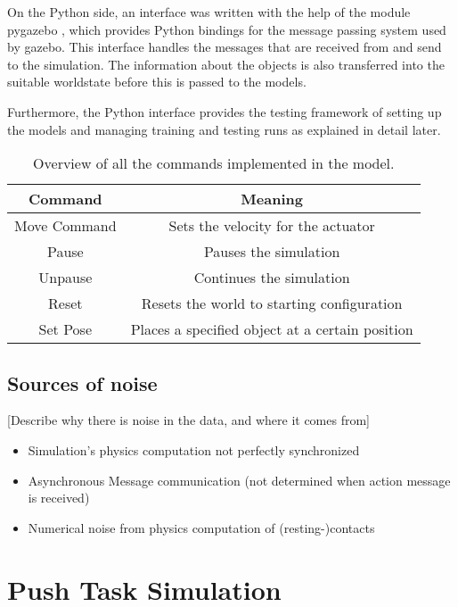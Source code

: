 On the Python side, an interface was written with the help of the module pygazebo \cite{pygazebo}, which provides Python bindings for the message passing system used by gazebo. This interface handles the messages that are received from and send to the simulation. 
The information about the objects is also transferred into the suitable worldstate before this is passed to the models.

Furthermore, the Python interface provides the testing framework of setting up the models and managing training and testing runs as explained in detail later.

\begin{table}
	\centering
	\begin{tabular}{|c|c|}
		\hline \textbf{Command} & \textbf{Meaning} \\ 
		\hline Move Command & Sets the velocity for the actuator \\ 
		\hline Pause & Pauses the simulation \\
		\hline Unpause & Continues the simulation \\
		\hline Reset & Resets the world to starting configuration \\
		\hline Set Pose & Places a specified object at a certain position \\
		\hline
	\end{tabular} 
	\caption{Overview of all the commands implemented in the model.}
	\label{tab:commands}
\end{table}

\subsection{Sources of noise}
[Describe why there is noise in the data, and where it comes from]
\begin{itemize}
\item Simulation's physics computation not perfectly synchronized %
\item Asynchronous Message communication (not determined when action message is received)
\item Numerical noise from physics computation of (resting-)contacts
\end{itemize}

\section{Push Task Simulation \label{sec:pushTaskSim}}

